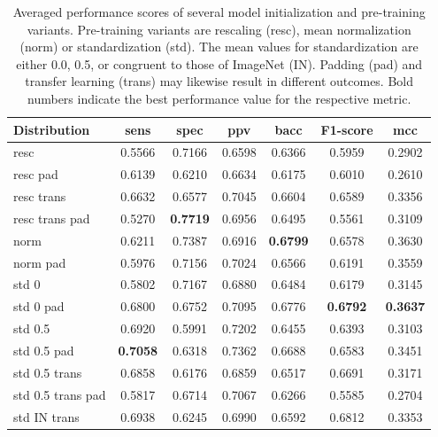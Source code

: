 \begin{table}[H]
    \centering
    \begin{tabular}{|l|c|c|c|c|c|c|}
        \hline
        Distribution & \acrshort{sens} & \acrshort{spec} & \acrshort{ppv} & \acrshort{bacc} & F1-score & \acrshort{mcc} \\\hline\hline
        resc & 0.5566 & 0.7166 & 0.6598 & 0.6366 & 0.5959 & 0.2902 \\
        resc pad & 0.6139 & 0.6210 & 0.6634 & 0.6175 & 0.6010 & 0.2610 \\
        resc trans & 0.6632 & 0.6577 & 0.7045 & 0.6604 & 0.6589 & 0.3356 \\
        resc trans pad & 0.5270 & \textbf{0.7719} & 0.6956 & 0.6495 & 0.5561 & 0.3109 \\
        norm & 0.6211 & 0.7387 & 0.6916 & \textbf{0.6799} & 0.6578 & 0.3630 \\
        norm pad & 0.5976 & 0.7156 & 0.7024 & 0.6566 & 0.6191 & 0.3559 \\
        std 0 & 0.5802 & 0.7167 & 0.6880 & 0.6484 & 0.6179 & 0.3145 \\
        std 0 pad & 0.6800 & 0.6752 & 0.7095 & 0.6776 & \textbf{0.6792} & \textbf{0.3637} \\
        std 0.5 & 0.6920 & 0.5991 & 0.7202 & 0.6455 & 0.6393 & 0.3103 \\
        std 0.5 pad & \textbf{0.7058} & 0.6318 & 0.7362 & 0.6688 & 0.6583 & 0.3451 \\
        std 0.5 trans & 0.6858 & 0.6176 & 0.6859 & 0.6517 & 0.6691 & 0.3171 \\
        std 0.5 trans pad & 0.5817 & 0.6714 & 0.7067 & 0.6266 & 0.5585 & 0.2704 \\
        std IN trans & 0.6938 & 0.6245 & 0.6990 & 0.6592 & 0.6812 & 0.3353 \\
        \hline
    \end{tabular}
    \caption[Initialization and pre-training variants]{Averaged performance scores of several model initialization and pre-training variants. Pre-training variants are rescaling (resc), mean normalization (norm) or standardization (std). The mean values for standardization are either 0.0, 0.5, or congruent to those of ImageNet (IN). Padding (pad) and transfer learning (trans) may likewise result in different outcomes. Bold numbers indicate the best performance value for the respective metric.}
    \label{tab:init_pretrain}
\end{table}
